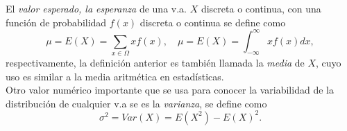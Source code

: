 El \emph{valor esperado, la esperanza} de una v.a. $X$ discreta o continua, con una función de probabilidad $f(x)$  discreta o continua se define como
\begin{equation}
	\mu=E(X)=\sum_{x\in \Omega}xf(x),
	\quad
	\mu=E(X)=\int_{-\infty}^{\infty}xf(x)dx,
\end{equation}
respectivamente, la definición anterior  es también llamada la \emph{media} de $X$, cuyo uso es  similar a la media aritmética en estadísticas.\\



\noindent Otro valor numérico importante que se usa para conocer la variabilidad de la distribución de cualquier v.a se es la  \emph{varianza},  se define como
\begin{equation}
	\sigma^2=Var(X)=E(X^2)-E(X)^2.
\end{equation}

